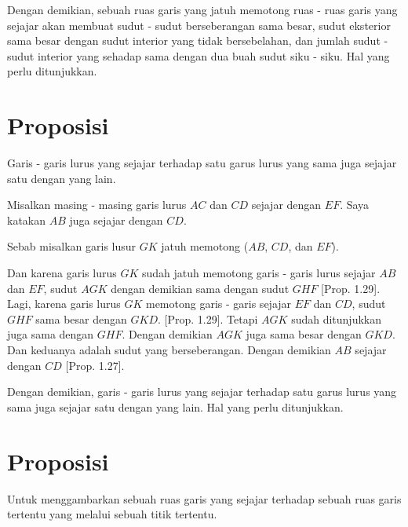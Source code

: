 \documentclass[a4paper]{book}
\begin{document}
Dengan demikian, sebuah ruas garis yang jatuh memotong ruas - ruas garis 
yang sejajar akan membuat sudut - sudut berseberangan sama besar, sudut 
eksterior sama besar dengan sudut interior yang tidak bersebelahan, dan jumlah 
sudut - sudut interior yang sehadap sama dengan dua buah sudut siku - siku.
Hal yang perlu ditunjukkan.

\section*{\centering Proposisi \thesection} 
Garis - garis lurus yang sejajar terhadap satu garus lurus yang sama
juga sejajar satu dengan yang lain.  
\begin{center}
\end{center}

Misalkan masing - masing garis lurus $AC$ dan $CD$ sejajar dengan $EF$. Saya
katakan $AB$ juga sejajar dengan $CD$.

Sebab misalkan garis lusur $GK$ jatuh memotong ($AB$, $CD$, dan $EF$).

Dan karena garis lurus $GK$ sudah jatuh memotong garis - garis lurus sejajar
$AB$ dan $EF$, sudut $AGK$ dengan demikian sama dengan sudut $GHF$ 
[Prop. 1.29]. Lagi, karena garis lurus $GK$ memotong garis - garis sejajar
$EF$ dan $CD$, sudut $GHF$ sama besar dengan $GKD$. [Prop. 1.29]. Tetapi $AGK$
sudah ditunjukkan juga sama dengan $GHF$. Dengan demikian $AGK$ juga
sama besar dengan $GKD$. Dan keduanya adalah sudut yang berseberangan.
Dengan demikian $AB$ sejajar dengan $CD$ [Prop. 1.27].

Dengan demikian, garis - garis lurus yang sejajar terhadap satu garus lurus 
yang sama juga sejajar satu dengan yang lain. Hal yang perlu ditunjukkan.

\section*{\centering Proposisi \thesection} 
Untuk menggambarkan sebuah ruas garis yang sejajar terhadap sebuah ruas 
garis tertentu yang melalui sebuah titik tertentu.
\end{document}
